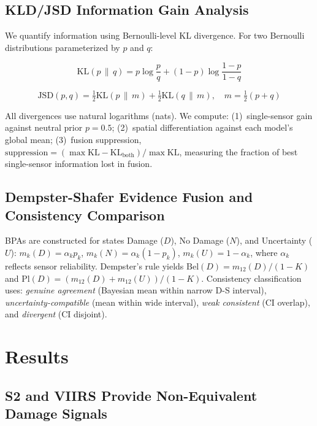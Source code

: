 \documentclass[wcp]{jmlr}
\begin{document}
\subsection{KLD/JSD Information Gain Analysis}\label{sec:kld}

We quantify information using Bernoulli-level KL divergence. For two
Bernoulli distributions parameterized by $p$ and $q$:

\begin{equation}
\mathrm{KL}(p \,\|\, q) = p\log\frac{p}{q} + (1-p)\log\frac{1-p}{1-q}
\label{eq:kl}
\end{equation}

\begin{equation}
\mathrm{JSD}(p, q) = \tfrac{1}{2}\mathrm{KL}(p \,\|\, m)
  + \tfrac{1}{2}\mathrm{KL}(q \,\|\, m),\quad
  m = \tfrac{1}{2}(p+q)
\label{eq:jsd}
\end{equation}

All divergences use natural logarithms (nats). We compute: (1)~single-sensor
gain against neutral prior $p=0.5$; (2)~spatial differentiation against
each model's global mean; (3)~fusion suppression,
$\text{suppression} = (\max\text{KL} - \text{KL}_{\text{both}}) /
\max\text{KL}$, measuring the fraction of best single-sensor information
lost in fusion.

\subsection{Dempster-Shafer Evidence Fusion and Consistency
Comparison}\label{sec:ds}

BPAs are constructed for states Damage ($D$), No Damage ($N$), and
Uncertainty ($U$): $m_k(D) = \alpha_k p_k$, $m_k(N) = \alpha_k (1-p_k)$,
$m_k(U)=1-\alpha_k$, where $\alpha_k$ reflects sensor reliability.
Dempster's rule yields $\text{Bel}(D) = m_{12}(D)/(1-K)$ and
$\text{Pl}(D) = (m_{12}(D)+m_{12}(U))/(1-K)$. Consistency classification
uses: \emph{genuine agreement} (Bayesian mean within narrow D-S interval),
\emph{uncertainty-compatible} (mean within wide interval),
\emph{weak consistent} (CI overlap), and \emph{divergent} (CI disjoint).

\section{Results}\label{sec:results}

\subsection{S2 and VIIRS Provide Non-Equivalent Damage Signals}\label{sec:res-disagree}
\end{document}
